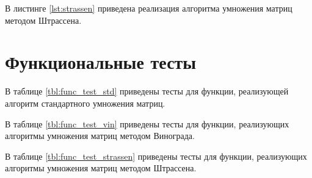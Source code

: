 В листинге \ref{lst:strassen} приведена реализация алгоритма умножения матриц методом Штрассена.



\clearpage



\clearpage



\clearpage



\clearpage

\section{Функциональные тесты}
В таблице \ref{tbl:func_test_std} приведены тесты для функции, реализующей алгоритм стандартного умножения матриц.

В таблице \ref{tbl:func_test_vin} приведены тесты для функции, реализующих алгоритмы умножения матриц методом Винограда.

В таблице \ref{tbl:func_test_strassen} приведены тесты для функции, реализующих алгоритмы умножения матриц методом Штрассена.

